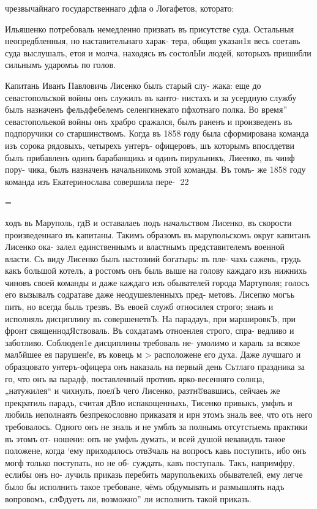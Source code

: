 чрезвычайнаго государственнаго дфла о Логафетов, которато:

Ильяшенко потребоваль немедленно призвать въ присутстве
суда. Остальныя неопредбленныя, но наставительнаго харак-
тера, общия указан1я весь соетавь суда выслушалъ, етоя и
молча, находясь въ состолЫи людей, которыхъ пришибли
сильнымъ ударомъь по голов.

Капитань Иванъ Павловичь Лисенко былъ старый слу-
жака: еще до севастопольской войны онъ служилъ въ канто-
нистахъ и за усердную службу былъ назначенъ фельдфебелемъ
селенгинекато пфхотнаго полка. Во время” севастопольекой
войны онъ храбро сражался, былъ раненъ и произведенъ въ
подпоручики со старшинствомъ. Когда въ 1858 году была
сформирована команда изъ сорока рядовыхъ, четырехъ унтеръ-
офицеровъ, шъ которымъ впослдетви былъ прибавленъ одинъ
барабанщикь и одинъ пирульникъ, Лиеенко, въ чинф пору-
чика, былъ назначенъ начальникомь этой команды. Въ томъ-
же 1858 году команда изъ Екатеринослава совершила пере-
22

=

ходъ вь Маруполь, гдВ и оставалаеь подъ начальством
Лисенко, въ скорости произведеннаго въ капитаны. Такимъ
образомъ въ марупольскомъ округ капитанъ Лисенко ока-
залел единственнымъ и властнымъ представителемъ военной
власти. Съ виду Лисенко былъ настозиий богатырь: въ пле-
чахь сажень, грудь какъ большой котелъ, а ростомъ онъ
быль выше на голову каждаго изъ нижнихь чиновъ своей
команды и даже каждаго изъ обывателей города Мартуполя;
голосъ его вызывалъ содратаве даже неодушевленныхъ пред-
метовъ. Лисепко могъь пить, но всегда быль трезвъ. Въ евоей
служб относилея строго; знаяъ и исполняль дисциплину
въ совершенетвЪ. На парадауъ, при маршировкЪ, при фронт%
священнодЯствоваль. Въ сохдатамъ отноенлея строго, спра-
ведливо и заботливо. Соблюден1е дисциплины требоваль не-
умолимо и караль за всякое мал5йшее ея парушен!е, въ
ковець м > расположене его духа. Даже лучшаго
и образцовато унтеръ-офицера онъ наказаль на первый день
Сътлаго праздника за го, что онъ ва парадф, поставленный
противъ ярко-весенняго солнца, „натужилея“ и чихнулъ,
поелЪ чего Лисенко, разтн®вавшись, сейчаеь же прекратиль
парадъ, считая дВло испакощенныхь, Тисенко привыкъ, умфлъ
и любиль иеполнаять безпрекословно приказатя и ирн этомъ
зналь вее, что оть него требовалось. Одного онъ не зналь
и не умблъ за полнымь отсутстыемь практики въ этомъ от-
ношени: опъ не умфль думать, и всей душой невавидль
таное положене, когда ‘ему приходилось отвЗчаль на вопросъ
кавь поступить, ибо онъ могф только поступать, но не об-
суждать, кавъ поступаль. Такъ, напримфру, еслибы онъ но-
лучиль приказь перебить марупольекихь обывателей, ему
легче было бы исполнить такое требоване, чёмъ обдумывать
и размышлять надъ вопровомъ, слФдуеть ли, возможно” ли
исполнить такой приказъ.

